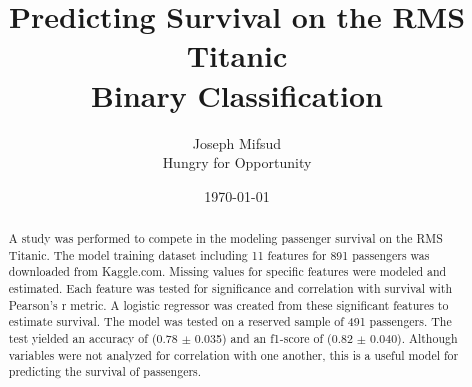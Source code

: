 \documentclass[10pt]{article}
\title{Predicting Survival on the RMS Titanic\\
	\large{Binary Classification}}
\author{	Joseph Mifsud  \\
		Hungry for Opportunity}
\date{\today}
\begin{document}
\maketitle
\begin{abstract}

	A study was performed to compete in the modeling passenger survival on the RMS Titanic.
	The model training dataset including 11 features for 891 passengers was downloaded from Kaggle.com.
	Missing values for specific features were modeled and estimated.
	Each feature was tested for significance and correlation with survival with Pearson's r metric.
	A logistic regressor was created from these significant features to estimate survival.
	The model was tested on a reserved sample of 491 passengers.
	The test yielded an accuracy of (0.78 $\pm$ 0.035) and an f1-score of (0.82 $\pm$ 0.040).
	Although variables were not analyzed for correlation with one another, this is a useful model for predicting the survival of passengers.

\end{abstract}
\end{document}
